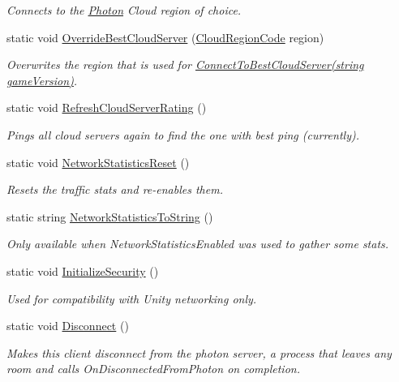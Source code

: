 \begin{DoxyCompactItemize}
\begin{DoxyCompactList}\small\item\em Connects to the \hyperlink{namespace_photon}{Photon} Cloud region of choice. \end{DoxyCompactList}\item 
static void \hyperlink{class_photon_network_a7dc90dd05d697c3f8f04e50cc0e039b2}{Override\+Best\+Cloud\+Server} (\hyperlink{_enums_8cs_af823e3be9567fa753720895120c9819b}{Cloud\+Region\+Code} region)
\begin{DoxyCompactList}\small\item\em Overwrites the region that is used for \hyperlink{class_photon_network_afba456bbc9d1525b87eb060c959af2b6}{Connect\+To\+Best\+Cloud\+Server(string game\+Version)}. \end{DoxyCompactList}\item 
static void \hyperlink{class_photon_network_a6ffa9e23d8060c9898064cda0a21710b}{Refresh\+Cloud\+Server\+Rating} ()
\begin{DoxyCompactList}\small\item\em Pings all cloud servers again to find the one with best ping (currently).\end{DoxyCompactList}\item 
static void \hyperlink{class_photon_network_a43f616ce19891d3de81269a7821c5656}{Network\+Statistics\+Reset} ()
\begin{DoxyCompactList}\small\item\em Resets the traffic stats and re-\/enables them. \end{DoxyCompactList}\item 
static string \hyperlink{class_photon_network_aebed3f221d6a2d918cb734a15b9df8e0}{Network\+Statistics\+To\+String} ()
\begin{DoxyCompactList}\small\item\em Only available when Network\+Statistics\+Enabled was used to gather some stats. \end{DoxyCompactList}\item 
static void \hyperlink{class_photon_network_aa4005f5ff36461d51f9d2c2c326550ac}{Initialize\+Security} ()
\begin{DoxyCompactList}\small\item\em Used for compatibility with Unity networking only. \end{DoxyCompactList}\item 
static void \hyperlink{class_photon_network_aeb81fe77dfd0ebf7c8a63191a6a8fced}{Disconnect} ()
\begin{DoxyCompactList}\small\item\em Makes this client disconnect from the photon server, a process that leaves any room and calls On\+Disconnected\+From\+Photon on completion. \end{DoxyCompactList}\item 

\end{DoxyCompactItemize}
